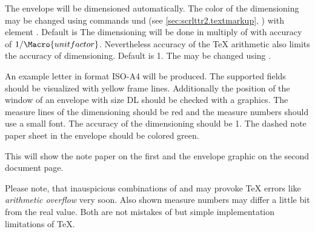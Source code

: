%
The envelope will be dimensioned automatically. The color of the dimensioning
may be changed using commands  und 
(see \autoref{sec:scrlttr2.textmarkup},
) with element
. Default is
 The dimensioning will be done in multiply of
 with accuracy of $1/\Macro{unitfactor}$. Nevertheless
accuracy of the \TeX{} arithmetic also limits the accuracy of
dimensioning. Default is 1. The  may be changed using
.%
%

\begin{Example}
  An example letter in format ISO-A4 will be produced. The supported fields
  should be visualized with yellow frame lines. Additionally the position of
  the window of an envelope with size DL should be checked with a
  graphics. The measure lines of the dimensioning should be red and the
  measure numbers should use a small font. The accuracy of the dimensioning
  should be 1. The dashed note paper sheet in the envelope should be
  colored green.
  This will show the note paper on the first and the envelope graphic on the
  second document page.
\end{Example}

Please note, that inauspicious combinations of  and
 may provoke \TeX{} errors like \emph{arithmetic overflow}
very soon. Also shown measure numbers may differ a little bit from the real
value. Both are not mistakes of  but simple implementation
limitations of \TeX.
%
%
%
%
%
%
%
%
%
%
%


